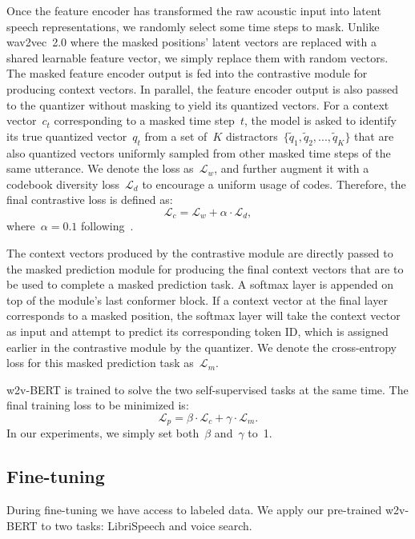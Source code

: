 \documentclass{article}
\begin{document}
Once the feature encoder has transformed the raw acoustic input into latent speech representations, we randomly select some time steps to mask.
Unlike wav2vec~2.0 where the masked positions' latent vectors are replaced with a shared learnable feature vector, we simply replace them with random vectors.
The masked feature encoder output is fed into the contrastive module for producing context vectors.
In parallel, the feature encoder output is also passed to the quantizer without masking to yield its quantized vectors.
For a context vector~$c_{t}$ corresponding to a masked time step~$t$, the model is asked to identify its true quantized vector~$q_{t}$ from a set of~$K$ distractors~$\{\tilde{q}_{1}, \tilde{q}_{2}, ..., \tilde{q}_{K}\}$ that are also quantized vectors uniformly sampled from other masked time steps of the same utterance.
We denote the loss as~$\mathcal{L}_{w}$, and further augment it with a codebook diversity loss~$\mathcal{L}_{d}$ to encourage a uniform usage of codes.
Therefore, the final contrastive loss is defined as:
\begin{equation}
  \mathcal{L}_{c} = \mathcal{L}_{w} + \alpha \cdot \mathcal{L}_{d},
  \label{eq:contrastive_loss}
\end{equation}
where~$\alpha = 0.1$ following~\cite{baevski2020wav2vec}.

The context vectors produced by the contrastive module are directly passed to the masked prediction module for producing the final context vectors that are to be used to complete a masked prediction task.
A softmax layer is appended on top of the module's last conformer block.
If a context vector at the final layer corresponds to a masked position, the softmax layer will take the context vector as input and attempt to predict its corresponding token ID, which is assigned earlier in the contrastive module by the quantizer.
We denote the cross-entropy loss for this masked prediction task as~$\mathcal{L}_{m}$.

w2v-BERT is trained to solve the two self-supervised tasks at the same time.
The final training loss to be minimized is:
\begin{equation}
  \mathcal{L}_{p} = \beta \cdot \mathcal{L}_{c} + \gamma \cdot \mathcal{L}_{m}.
\end{equation}
In our experiments, we simply set both~$\beta$ and~$\gamma$ to~1.

\subsection{Fine-tuning}
During fine-tuning we have access to labeled data.
We apply our pre-trained w2v-BERT to two tasks: LibriSpeech and voice search.
\end{document}

